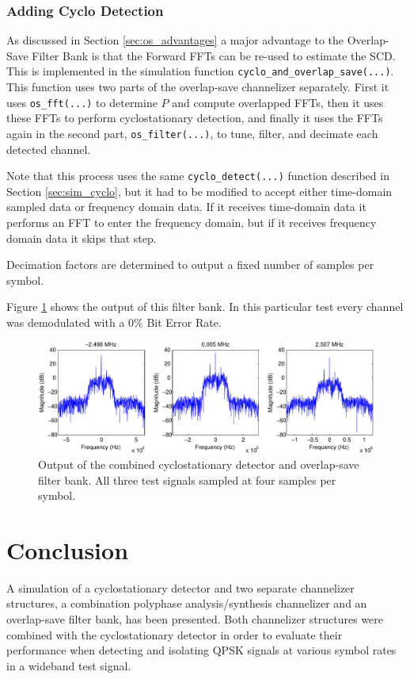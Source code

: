 \documentclass[12pt]{report}
\begin{document}
\subsection{Adding Cyclo Detection}
\label{sec:sim_os_cyclo}
As discussed in Section \ref{sec:os_advantages} a major advantage to the
Overlap-Save Filter Bank is that the Forward FFTs can be re-used to estimate
the SCD. This is implemented in the simulation function
\texttt{cyclo\_and\_overlap\_save(...)}. This function uses two parts of the
overlap-save channelizer separately.  First it uses \texttt{os\_fft(...)} to
determine $P$ and compute overlapped FFTs, then it uses these FFTs to perform
cyclostationary detection, and finally it uses the FFTs again in the second part,
\texttt{os\_filter(...)}, to tune, filter, and decimate each detected channel.

Note that this process uses the same \texttt{cyclo\_detect(...)} function 
described in Section \ref{sec:sim_cyclo}, but it had to be modified to accept
either time-domain sampled data or frequency domain data. If it receives
time-domain data it performs an FFT to enter the frequency domain, but if it
receives frequency domain data it skips that step.

Decimation factors are determined to output a fixed number of samples per symbol.

Figure \ref{fig:cyclo_os_results} shows the output of this filter bank. In this
particular test every channel was demodulated with a 0\% Bit Error Rate.

\begin{figure}[bh!]
    \includegraphics[width=\textwidth]{cyclo_os_results}%
\caption{Output of the combined cyclostationary detector and overlap-save filter bank. All three test signals sampled at four samples per symbol.}
\label{fig:cyclo_os_results}
\end{figure}

\chapter{Conclusion}
\label{sec:conclusion}
A simulation of a cyclostationary detector and two separate channelizer
structures, a combination polyphase analysis/synthesis channelizer and an
overlap-save filter bank, has been presented. Both channelizer structures
were combined with the cyclostationary detector in order to evaluate their
performance when detecting and isolating QPSK signals at various symbol rates
in a wideband test signal.
\end{document}
